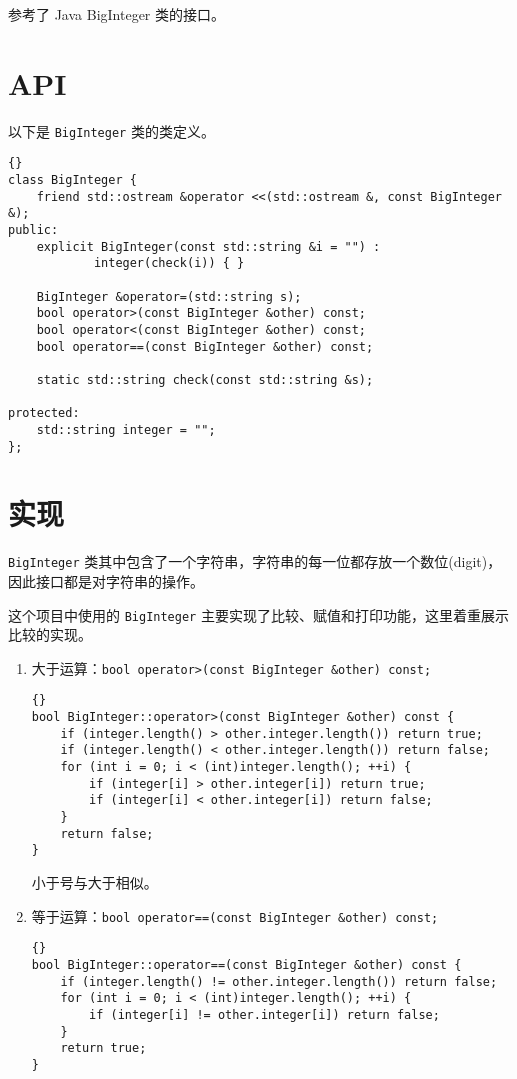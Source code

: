 参考了 Java BigInteger 类的接口。

\section{API}

以下是 \lstinline{BigInteger} 类的类定义。
{
\begin{lstlisting}[firstnumber=251, caption=BigInteger 类定义]{}
class BigInteger {
    friend std::ostream &operator <<(std::ostream &, const BigInteger &);
public:
    explicit BigInteger(const std::string &i = "") :
            integer(check(i)) { }

    BigInteger &operator=(std::string s);
    bool operator>(const BigInteger &other) const;
    bool operator<(const BigInteger &other) const;
    bool operator==(const BigInteger &other) const;

    static std::string check(const std::string &s);

protected:
    std::string integer = "";
};
\end{lstlisting}


\section{实现}

\lstinline{BigInteger} 类其中包含了一个字符串，字符串的每一位都存放一个{\kaishu 数位(digit)}，%
因此接口都是对字符串的操作。

这个项目中使用的 \lstinline{BigInteger} 主要实现了比较、赋值和打印功能，这里着重展示比较的实现。

\begin{enumerate}
    \item 大于运算：\lstinline{bool operator>(const BigInteger &other) const;}\\
\begin{lstlisting}[firstnumber=273]{}
bool BigInteger::operator>(const BigInteger &other) const {
    if (integer.length() > other.integer.length()) return true;
    if (integer.length() < other.integer.length()) return false;
    for (int i = 0; i < (int)integer.length(); ++i) {
        if (integer[i] > other.integer[i]) return true;
        if (integer[i] < other.integer[i]) return false;
    }
    return false;
}
\end{lstlisting}
小于号与大于相似。
    \item 等于运算：\lstinline{bool operator==(const BigInteger &other) const;}\\
\begin{lstlisting}[firstnumber=293]{}
bool BigInteger::operator==(const BigInteger &other) const {
    if (integer.length() != other.integer.length()) return false;
    for (int i = 0; i < (int)integer.length(); ++i) {
        if (integer[i] != other.integer[i]) return false;
    }
    return true;
}
\end{lstlisting}
\end{enumerate}

}
